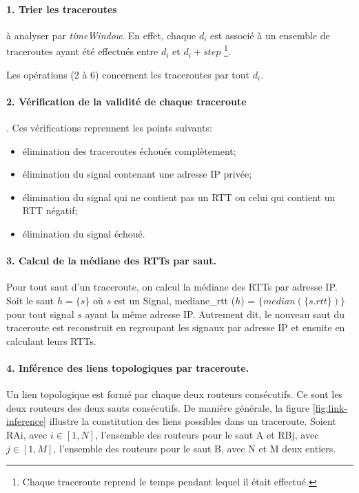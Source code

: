 \paragraph{1. Trier les traceroutes } à analyser par \textit{timeWindow}. En effet, chaque $d_i$ est associé à un ensemble de traceroutes ayant été effectués entre $d_i$ et $d_i + step$ \footnote{Chaque traceroute reprend le temps pendant lequel il était effectué.}. 

\begin{figure}[H]
	\centering
	\captionsetup{justification=centering}
	
	\caption{}
	\label{fig:timing_tex}
\end{figure}


Les opérations  (2 à 6) concernent  les traceroutes par tout $d_i$.  

\paragraph{2. Vérification de la validité de chaque traceroute }. Ces vérifications reprennent les points suivants:
\begin{itemize}
	\item élimination des traceroutes échoués complètement;
	\item élimination du signal contenant une adresse IP privée;
	\item élimination du signal qui ne contient pas un RTT ou celui qui contient un RTT négatif;
	\item  élimination du signal échoué.
\end{itemize}

\paragraph{3. Calcul de la médiane des RTTs par saut.} Pour tout saut d'un traceroute,  on calcul la médiane des RTTs par adresse IP. Soit le saut $h =\{s \}$ où $s$ est un  Signal, mediane\_rtt ($h$) =  $\{median(\{s.rtt\})\}$  pour tout signal $s$ ayant la même adresse IP. Autrement dit, le nouveau saut du traceroute est reconstruit en regroupant les signaux par adresse IP et ensuite en calculant leurs RTTs. 




\paragraph{4. Inférence des liens topologiques par traceroute.} Un lien topologique est formé par chaque deux routeurs consécutifs. Ce sont les deux routeurs des deux sauts consécutifs. De manière générale, la figure \ref{fig:link-inference} illustre la constitution des liens possibles  dans un traceroute. Soient  RAi, avec $i \in [1,N]$,  l'ensemble des routeurs pour le saut A et RBj, avec $j \in [1,M]$, l'ensemble  des routeurs pour le saut B, avec N et M deux entiers.



